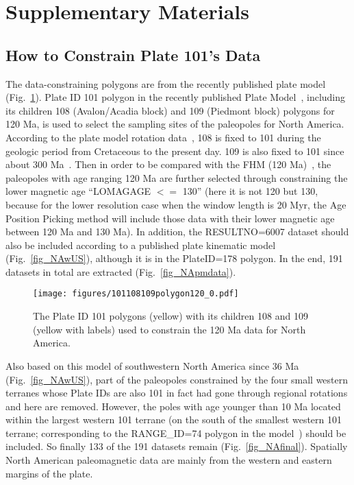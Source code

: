\section{Supplementary Materials}

\subsection{How to Constrain Plate 101's Data}
The data-constraining polygons are from the recently published plate
model~\cite{Y18} (Fig.~\ref{fig_NApolygon}). Plate ID 101 polygon in the
recently published Plate Model~\cite{Y18}, including its children 108
(Avalon/Acadia block) and 109 (Piedmont block) polygons for 120 Ma,
is used to select the sampling sites of the paleopoles for North America.
According to the plate model rotation data~\cite{Y18}, 108 is fixed to 101
during the geologic period from Cretaceous to the present day. 109 is also fixed
to 101 since about 300 Ma~\cite{C14}. Then in order to be compared with the FHM
(120 Ma)~\cite{M93,M99}, the paleopoles with age ranging
120 Ma are further selected through constraining the lower magnetic
age ``LOMAGAGE $<=$ 130'' (here it is not 120 but 130, because for the lower
resolution case when the window length is 20 Myr, the Age Position Picking
method will include those data with their lower magnetic age between 120 Ma and
130 Ma). In addition, the RESULTNO=6007 dataset should also be included
according to a published plate kinematic model~\cite{Mc06}
(Fig.~\ref{fig_NAwUS}), although it is in the PlateID=178 polygon. In the end,
191 datasets in total are extracted (Fig.~\ref{fig_NApmdata}).

\begin{figure}
\texttt{[image: figures/101108109polygon120\_0.pdf]}
\caption{The Plate ID 101 polygons (yellow) with its children 108 and 109
(yellow with labels) used to constrain the 120 Ma data for North
America.}\label{fig_NApolygon}
\end{figure}

Also based on this model of southwestern North America since 36 Ma~\cite{Mc06}
(Fig.~\ref{fig_NAwUS}), part of the paleopoles constrained by the four small
western terranes whose Plate IDs are also 101 in fact had gone through regional
rotations and here are removed. However, the poles with age younger than 10 Ma
located within the largest western 101 terrane (on the south of the smallest
western 101 terrane; corresponding to the RANGE\_ID=74 polygon in the
model~\cite{Mc06}) should be included. So finally 133 of the 191 datasets remain
(Fig.~\ref{fig_NAfinal}). Spatially North American paleomagnetic data are mainly
from the western and eastern margins of the plate.

